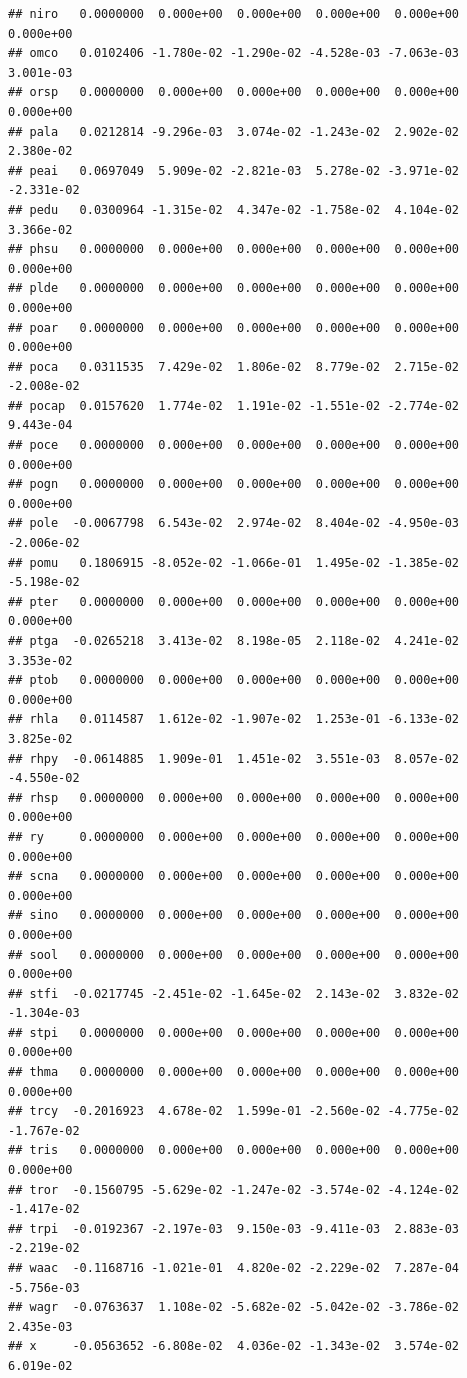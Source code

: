 \documentclass[
]{article}
\begin{document}
\begin{verbatim}
## niro   0.0000000  0.000e+00  0.000e+00  0.000e+00  0.000e+00  0.000e+00
## omco   0.0102406 -1.780e-02 -1.290e-02 -4.528e-03 -7.063e-03  3.001e-03
## orsp   0.0000000  0.000e+00  0.000e+00  0.000e+00  0.000e+00  0.000e+00
## pala   0.0212814 -9.296e-03  3.074e-02 -1.243e-02  2.902e-02  2.380e-02
## peai   0.0697049  5.909e-02 -2.821e-03  5.278e-02 -3.971e-02 -2.331e-02
## pedu   0.0300964 -1.315e-02  4.347e-02 -1.758e-02  4.104e-02  3.366e-02
## phsu   0.0000000  0.000e+00  0.000e+00  0.000e+00  0.000e+00  0.000e+00
## plde   0.0000000  0.000e+00  0.000e+00  0.000e+00  0.000e+00  0.000e+00
## poar   0.0000000  0.000e+00  0.000e+00  0.000e+00  0.000e+00  0.000e+00
## poca   0.0311535  7.429e-02  1.806e-02  8.779e-02  2.715e-02 -2.008e-02
## pocap  0.0157620  1.774e-02  1.191e-02 -1.551e-02 -2.774e-02  9.443e-04
## poce   0.0000000  0.000e+00  0.000e+00  0.000e+00  0.000e+00  0.000e+00
## pogn   0.0000000  0.000e+00  0.000e+00  0.000e+00  0.000e+00  0.000e+00
## pole  -0.0067798  6.543e-02  2.974e-02  8.404e-02 -4.950e-03 -2.006e-02
## pomu   0.1806915 -8.052e-02 -1.066e-01  1.495e-02 -1.385e-02 -5.198e-02
## pter   0.0000000  0.000e+00  0.000e+00  0.000e+00  0.000e+00  0.000e+00
## ptga  -0.0265218  3.413e-02  8.198e-05  2.118e-02  4.241e-02  3.353e-02
## ptob   0.0000000  0.000e+00  0.000e+00  0.000e+00  0.000e+00  0.000e+00
## rhla   0.0114587  1.612e-02 -1.907e-02  1.253e-01 -6.133e-02  3.825e-02
## rhpy  -0.0614885  1.909e-01  1.451e-02  3.551e-03  8.057e-02 -4.550e-02
## rhsp   0.0000000  0.000e+00  0.000e+00  0.000e+00  0.000e+00  0.000e+00
## ry     0.0000000  0.000e+00  0.000e+00  0.000e+00  0.000e+00  0.000e+00
## scna   0.0000000  0.000e+00  0.000e+00  0.000e+00  0.000e+00  0.000e+00
## sino   0.0000000  0.000e+00  0.000e+00  0.000e+00  0.000e+00  0.000e+00
## sool   0.0000000  0.000e+00  0.000e+00  0.000e+00  0.000e+00  0.000e+00
## stfi  -0.0217745 -2.451e-02 -1.645e-02  2.143e-02  3.832e-02 -1.304e-03
## stpi   0.0000000  0.000e+00  0.000e+00  0.000e+00  0.000e+00  0.000e+00
## thma   0.0000000  0.000e+00  0.000e+00  0.000e+00  0.000e+00  0.000e+00
## trcy  -0.2016923  4.678e-02  1.599e-01 -2.560e-02 -4.775e-02 -1.767e-02
## tris   0.0000000  0.000e+00  0.000e+00  0.000e+00  0.000e+00  0.000e+00
## tror  -0.1560795 -5.629e-02 -1.247e-02 -3.574e-02 -4.124e-02 -1.417e-02
## trpi  -0.0192367 -2.197e-03  9.150e-03 -9.411e-03  2.883e-03 -2.219e-02
## waac  -0.1168716 -1.021e-01  4.820e-02 -2.229e-02  7.287e-04 -5.756e-03
## wagr  -0.0763637  1.108e-02 -5.682e-02 -5.042e-02 -3.786e-02  2.435e-03
## x     -0.0563652 -6.808e-02  4.036e-02 -1.343e-02  3.574e-02  6.019e-02

\end{verbatim}
\end{document}
